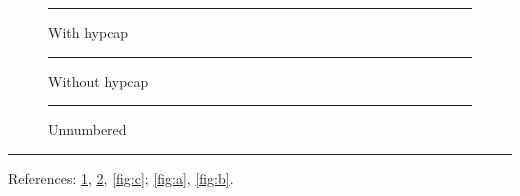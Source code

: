 \documentclass{article}
\begin{document}
\listoffigures

\begin{figure}[h]
  \centering
  \rule{4cm}{1cm}
  \caption{With hypcap}
  \label{fig:a}
\end{figure}

\begin{figure}[h]
  \captionsetup{hypcap=false}
  \centering
  \rule{4cm}{1cm}
  \caption{Without hypcap}
  \label{fig:b}
\end{figure}

\begin{figure}[h]
  \centering
  \rule{4cm}{1cm}
  \caption*{Unnumbered}
\end{figure}

\begin{center}
  \begin{minipage}{.5\linewidth}
    \centering
    \rule{2cm}{1cm}
    \label{fig:c}
  \end{minipage}
\end{center}

References: \ref{fig:a}, \ref{fig:b}, \ref{fig:c}; \autoref{fig:a}, \autoref{fig:b}.
\end{document}
